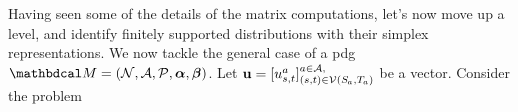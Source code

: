 \documentclass[twoside]{article}
\begin{document}
Having seen some of the details of the matrix computations, let's now move up a level, and identify finitely supported distributions with their simplex representations. 
We now tackle the general case of a pdg 
$\dg M = (\N, \Ar, \mathcal P, \balpha, \bbeta)$.
%
Let $\mat u = [u^a_{s,t}]^{a \in \Ar,}_{ (s,t) \in \V(\Src a, \Tgt a)}$
be a vector.
%
Consider the problem
\end{document}
